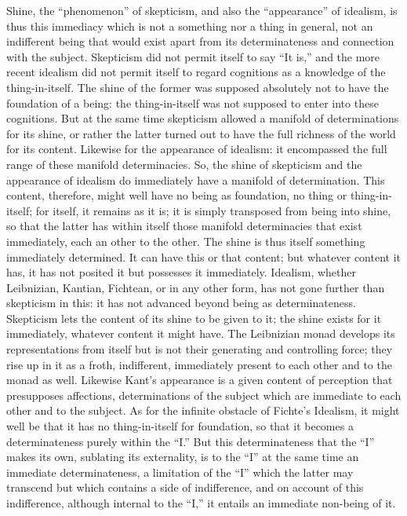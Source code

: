 Shine, the “phenomenon” of skepticism,
and also the “appearance” of idealism, is thus this immediacy
which is not a something nor a thing in general,
not an indifferent being that would exist apart from
its determinateness and connection with the subject.
Skepticism did not permit itself to say “It is,”
and the more recent idealism did not permit itself
to regard cognitions as a knowledge of the thing-in-itself.
The shine of the former was supposed absolutely
not to have the foundation of a being:
the thing-in-itself was not supposed to enter into these cognitions.
But at the same time skepticism allowed
a manifold of determinations for its shine,
or rather the latter turned out to have
the full richness of the world for its content.
Likewise for the appearance of idealism:
it encompassed the full range of these manifold determinacies.
So, the shine of skepticism and the appearance of idealism
do immediately have a manifold of determination.
This content, therefore, might well have no being as foundation,
no thing or thing-in-itself;
for itself, it remains as it is;
it is simply transposed from being into shine,
so that the latter has within itself those manifold
determinacies that exist immediately,
each an other to the other.
The shine is thus itself something immediately determined.
It can have this or that content;
but whatever content it has, it has not posited it
but possesses it immediately.
Idealism, whether Leibnizian, Kantian, Fichtean, or in any
other form, has not gone further than skepticism in this:
it has not advanced beyond being as determinateness.
Skepticism lets the content of its shine to be given to it;
the shine exists for it immediately,
whatever content it might have.
The Leibnizian monad develops its representations from itself
but is not their generating and controlling force;
they rise up in it as a froth, indifferent,
immediately present to each other and to the monad as well.
Likewise Kant's appearance is a given content of perception that
presupposes affections, determinations of the subject which are immediate
to each other and to the subject.
As for the infinite obstacle of Fichte's Idealism,
it might well be that it has no thing-in-itself for foundation,
so that it becomes a determinateness purely within the “I.”
But this determinateness that the “I” makes its own,
sublating its externality,
is to the “I” at the same time an immediate determinateness,
a limitation of the “I” which the latter may transcend
but which contains a side of indifference,
and on account of this indifference,
although internal to the “I,”
it entails an immediate non-being of it.

